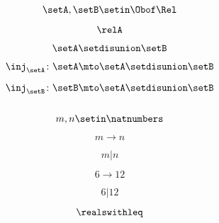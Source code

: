 {\begin{forslides}
        \begin{equation}
            \label{eq:feedback-119}
            \setA,\setB\setin \Obof\Rel
        \end{equation}

        \begin{equation}
            \label{eq:feedback-120}
            \relA
        \end{equation}

        \begin{equation}
            \label{eq:feedback-121}
            \setA \setdisunion \setB
        \end{equation}

        \begin{equation}
            \label{eq:feedback-122}
            \inj_\setA\colon \setA\mto \setA \setdisunion\setB
        \end{equation}

        \begin{equation}
            \label{eq:feedback-123}
            \inj_\setB\colon \setB\mto \setA \setdisunion\setB
        \end{equation}

        \begin{equation}
            \label{eq:feedback-124}
        \end{equation}

        \begin{equation}
            \label{eq:feedback-125}
            m,n\setin \natnumbers
        \end{equation}

        \begin{equation}
            \label{eq:feedback-126}
            m\to n
        \end{equation}

        \begin{equation}
            \label{eq:feedback-127}
            m | n
        \end{equation}

        \begin{equation}
            \label{eq:feedback-128}
            6\to 12
        \end{equation}

        \begin{equation}
            \label{eq:feedback-129}
            6 | 12
        \end{equation}

        \begin{equation}
            \label{eq:feedback-130}
            \realswithleq
        \end{equation}


\end{forslides}}
